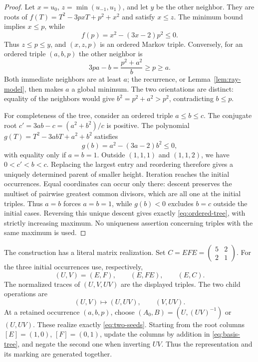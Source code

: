 \begin{proof}
Let $x=u_0$, $z=\min(u_{-1},u_1)$, and let $y$ be the other neighbor.
They are roots of $f(T)=T^2-3pxT+p^2+x^2$ and satisfy $x\leqslant z$.
The minimum bound implies $x\leqslant p$, while
$$
 f(p)=x^2-(3x-2)p^2\leqslant0.
$$
Thus $z\leqslant p\leqslant y$, and $(x,z,p)$ is an ordered Markov
triple. Conversely, for an ordered triple $(a,b,p)$ the other neighbor is
$$
 3pa-b=\frac{p^2+a^2}{b}\geqslant p\geqslant a.
$$
Both immediate neighbors are at least $a$; the recurrence, or
Lemma~\ref{lem:ray-model}, then makes $a$ a global minimum.
The two orientations are distinct: equality of the neighbors would give
$b^2=p^2+a^2>p^2$, contradicting $b\leqslant p$.

For completeness of the tree, consider an ordered triple $a\leqslant b\leqslant c$.
The conjugate root $c'=3ab-c=(a^2+b^2)/c$ is positive. The polynomial
$g(T)=T^2-3abT+a^2+b^2$ satisfies
$$
 g(b)=a^2-(3a-2)b^2\leqslant0,
$$
with equality only if $a=b=1$. Outside $(1,1,1)$ and $(1,1,2)$,
we have $0<c'<b<c$. Replacing the largest entry and reordering therefore
gives a uniquely determined parent of smaller height. Iteration reaches
the initial occurrences. Equal coordinates can occur only there:
descent preserves the multiset of pairwise greatest common divisors,
which are all one at the initial triples. Thus $a=b$ forces $a=b=1$,
while $g(b)<0$ excludes $b=c$ outside the initial cases.
Reversing this unique descent
gives exactly \eqref{eq:ordered-tree}, with strictly increasing maximum.
No uniqueness assertion concerning triples with the same maximum is used.
\end{proof}

The construction has a literal matrix realization. Set
$C=EFE=\left(\begin{smallmatrix}5&2\\2&1\end{smallmatrix}\right)$.
For the three initial occurrences use, respectively,
$$
 (U,V)=(E,F),\qquad(E,FE),\qquad(E,C).
$$
The normalized traces of $(U,V,UV)$ are the displayed triples.
The two child operations are
\begin{equation}\label{eq:basis-tree}
 (U,V)\longmapsto(U,UV),\qquad(V,UV).
\end{equation}
At a retained occurrence $(a,b,p)$, choose
$(A_0,B)=(U,(UV)^{-1})$ or $(U,UV)$. These realize exactly
\eqref{eq:two-seeds}. Starting from the root columns
$[E]=(1,0)$, $[F]=(0,1)$, update the columns by addition in
\eqref{eq:basis-tree}, and negate the second one when inverting $UV$.
Thus the representation and its marking are generated together.

